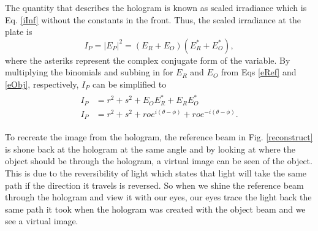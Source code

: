 \documentclass[ notitlepage, numerical, 11pt]{revtex4-1} %
\begin{document}
The quantity that describes the hologram is known as scaled irradiance which is Eq. \ref{iInf} without the constants in the front. Thus, the scaled irradiance at the plate is
\begin{equation}
I_{P} =  |E_P|^2 = (E_R + E_O) (E^*_{R} + E^*_{O}),
\label{If}
\end{equation}
where the asteriks represent the complex conjugate form of the variable.
By multiplying the binomials and subbing in for $E_R$ and $E_O$ from Eqs \ref{eRef} and \ref{eObj}, respectively, $I_P$ can be simplified to \cite{optics}
\begin{align}
\begin{split}
I_{P} &= r^2 + s^2 + E_O E^*_R + E_R E^*_O  \\
I_{P} &= r^2 + s^2 + roe^{i(\theta - \phi)} + roe^{-i(\theta - \phi)}.
\end{split}
\label{IfFinal}
\end{align}

To recreate the image from the hologram, the reference beam in Fig. \ref{reconstruct} is shone back at the hologram at the same angle and by looking at where the object should be through the hologram, a virtual image can be seen of the object. This is due to the reversibility of light which states that light will take the same path if the direction it travels is reversed. So when we shine the reference beam through the hologram and view it with our eyes, our eyes trace the light back the same path it took when the hologram was created with the object beam and we see a virtual image.
\end{document}
